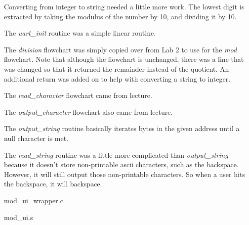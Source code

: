 \documentclass[letterpaper,10pt]{article}
\begin{document}
    Converting from integer to string needed a little more work. The lowest
    digit is extracted by taking the modulus of the number by 10, and dividing
    it by 10.

    

    The \textit{uart\_init} routine was a simple linear routine.
    

    The \textit{division} flowchart was simply copied over from Lab 2 to use
    for the \textit{mod} flowchart. Note that although the flowchart is
    unchanged, there was a line that was changed so that it returned the
    remainder instead of the quotient. An additional return was added on
    to help with converting a string to integer.

    

    The \textit{read\_character} flowchart came from lecture.
    

    The \textit{output\_character} flowchart also came from lecture.
    

    The \textit{output\_string} routine basically iterates bytes in the given
    address until a null character is met.
    

    The \textit{read\_string} routine was a little more complicated than
    \textit{output\_string} because it doesn't store non-printable ascii
    characters, such as the backspace. However, it will still output those
    non-printable characters. So when a user hits the backspace, it will
    backspace.
    

    mod\_ui\_wrapper.c
    

    \newpage

    mod\_ui.s
    
\end{document}

